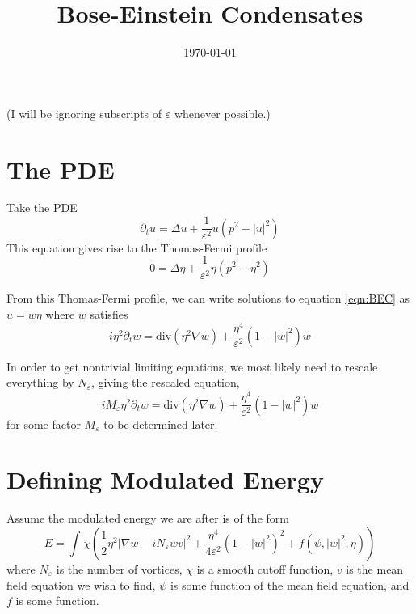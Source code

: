 \documentclass[a4paper]{article}
\title{Bose-Einstein Condensates }
\date{\today}
\author{}
\renewcommand{\div}{\mathrm{div}}
\begin{document}
\maketitle

(I will be ignoring subscripts of $\varepsilon$ whenever possible.)

\section{The PDE}
Take the PDE
\begin{equation} \label{eqn:BEC}
  \partial_t u = \Delta u + \frac{1}{\varepsilon^2}u (p^2 - |u|^2)
\end{equation}
This equation gives rise to the Thomas-Fermi profile
\begin{equation} \label{eqn:TF}
  0 = \Delta \eta + \frac{1}{\varepsilon^2} \eta( p^2 - \eta^2 )
\end{equation}

From this Thomas-Fermi profile, we can write solutions to equation \eqref{eqn:BEC} as $u = w \eta$ where $w$ satisfies
\begin{equation} \label{eqn:w}
  i \eta^2 \partial_t w = \div (\eta^2 \nabla w) + \frac{\eta^4}{\varepsilon^2} (1-|w|^2)w
\end{equation}

In order to get nontrivial limiting equations, we most likely need to rescale everything by $N_\varepsilon$, giving the rescaled equation,
\begin{equation}
  i M_\varepsilon \eta^2 \partial_t w = \div (\eta^2 \nabla w) + \frac{\eta^4}{\varepsilon^2} (1-|w|^2)w
  \label{eqn:rescaled_w}
\end{equation}
for some factor $M_\varepsilon$ to be determined later.

\section{Defining Modulated Energy}
Assume the modulated energy we are after is of the form
\begin{equation} \label{eqn:energy_form_primitive}
  E = \int_{}^{} \chi \left( \frac{1}{2} \eta^2 |\nabla w - i N_\varepsilon w v|^2 + \frac{\eta^4}{4 \varepsilon^2} ( 1 - |w|^2)^2 + f(\psi, |w|^2, \eta)  \right)
\end{equation}
where $N_\varepsilon$ is the number of vortices, $\chi$ is a smooth cutoff function, $v$ is the mean field equation we wish to find, $\psi$ is some
function of the mean field equation, and $f$ is some function.
\end{document}
